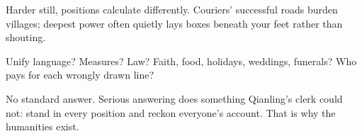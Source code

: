 Harder still, positions calculate differently. Couriers' successful roads burden villages; deepest power often quietly lays boxes beneath your feet rather than shouting.

Unify language? Measures? Law? Faith, food, holidays, weddings, funerals? Who pays for each wrongly drawn line?

No standard answer. Serious answering does something Qianling's clerk could not: stand in every position and reckon everyone's account. That is why the humanities exist.
